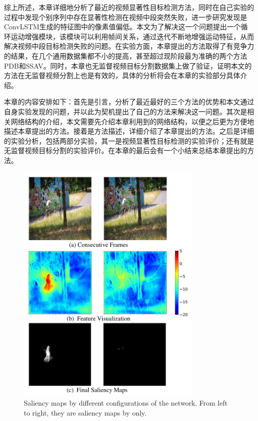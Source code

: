 综上所述，本章详细地分析了最近的视频显著性目标检测方法，同时在自己实验的过程中发现个别序列中存在显著性检测在视频中段突然失败，进一步研究发现是ConvLSTM生成的特征图中的像素值偏低。本文为了解决这一个问题提出一个循环运动增强模块，该模块可以利用帧间关系，通过迭代不断地增强运动特征，从而解决视频中段目标检测失败的问题。在实验方面，本章提出的方法取得了有竞争力的结果，在几个通用数据集都不小的提高，甚至超过现阶段最为准确的两个方法PDB和SSAV。同时，本章也无监督视频目标分割数据集上做了验证，证明本文的方法在无监督视频分割上也是有效的，具体的分析将会在本章的实验部分具体介绍。

本章的内容安排如下：首先是引言，分析了最近最好的三个方法的优势和本文通过自身实验发现的问题，并以此为契机提出了自己的方法来解决这一问题。其次是相关网络结构的介绍，本文需要先介绍本章利用到的网络结构，以便之后更为方便地描述本章提出的方法。接着是方法描述，详细介绍了本章提出的方法。之后是详细的实验分析，包括两部分实验，其一是视频显著性目标检测的实验评价；还有就是无监督视频目标分割的实验评价。在本章的最后会有一个小结来总结本章提出的方法。
\begin{figure}
\center
\includegraphics[width=0.8\textwidth]{figures/pull_figures_c4}
\caption{Saliency maps by different configurations of the network. From left to right, they are saliency maps by only.}
\label{pull_figures}
\end{figure}

